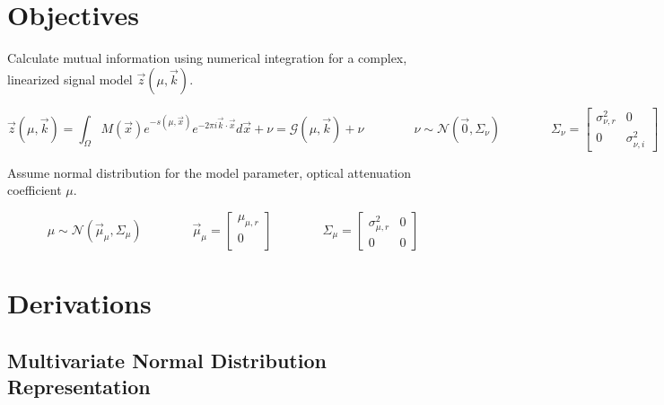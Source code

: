 \documentclass{article}         %
\theoremstyle{definition}
\theoremstyle{remark}
\begin{document}

\section{Objectives}\label{Objectives}

Calculate mutual information using numerical integration for a complex, linearized signal model $\vec{z}\left(\mu,\vec{k}\right)$.

\begin{equation}
	\vec{z}\left(\mu,\vec{k}\right) = \int_\Omega M\left(\vec{x}\right) e^{-s\left(\mu ,\vec{x}\right)}e^{-2\pi i\vec{k}\cdot\vec{x}}d\vec{x}+\nu=\mathcal{G}\left(\mu,\vec{k}\right)+\nu
	\qquad\qquad \nu\sim\mathcal{N}\left(\vec{0},\Sigma_\nu\right)
	\qquad\qquad \Sigma_\nu = \left[ \begin{array}{cc} 
		\sigma_{\nu,r}^2 & 0 \\
		0 & \sigma_{\nu,i}^2 \end{array} \right]
\end{equation}

Assume normal distribution for the model parameter, optical attenuation coefficient $\mu$.

\begin{equation}
	\mu\sim\mathcal{N}\left(\vec{\mu}_\mu,\Sigma_\mu\right)
	\qquad\qquad \vec{\mu}_\mu=\left[ \begin{array}{c}
		\mu_{\mu,r} \\ 0 \\ \end{array} \right]
	\qquad\qquad \Sigma_\mu=\left[\begin{array}{cc}
		\sigma_{\mu,r}^2 & 0 \\
		0 & 0 \end{array} \right]
\end{equation}

\section{Derivations}\label{Derivations}

\subsection{Multivariate Normal Distribution Representation}
\end{document}
